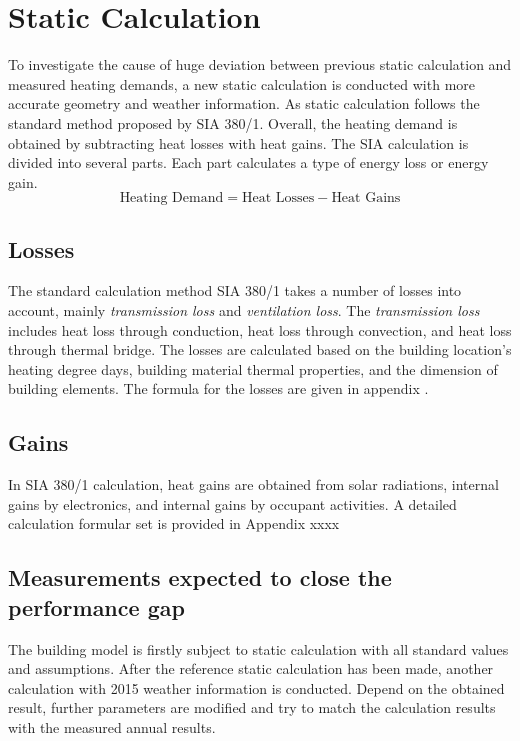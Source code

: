 \documentclass[a4paper, oneside]{discothesis}
\begin{document}
	\section{Static Calculation}
		To investigate the cause of huge deviation between previous static calculation and measured heating demands, a new static calculation is conducted with more accurate geometry and weather information. As static calculation follows the standard method proposed by SIA 380/1. Overall, the heating demand is obtained by subtracting heat losses with heat gains. The SIA calculation is divided into several parts. Each part calculates a type of energy loss or energy gain. \\
		\[\text{Heating Demand} = \text{Heat Losses} - \text{Heat Gains}\]
		
		\subsection{Losses}
			The standard calculation method SIA 380/1 takes a number of losses into account, mainly \textit{transmission loss} and \textit{ventilation loss}. The \textit{transmission loss} includes heat loss through conduction, heat loss through convection, and heat loss through thermal bridge. The losses are calculated based on the building location's heating degree days, building material thermal properties, and the dimension of building elements. The formula for the losses are given in appendix .\\

		\subsection{Gains}
			In SIA 380/1 calculation, heat gains are obtained from solar radiations, internal gains by electronics, and internal gains by occupant activities. A detailed calculation formular set is provided in Appendix xxxx \\
			
		\subsection{Measurements expected to close the performance gap}
			The building model is firstly subject to static calculation with all standard values and assumptions. After the reference static calculation has been made, another calculation with 2015 weather information is conducted. Depend on the obtained result, further parameters are modified and try to match the calculation results with the measured annual results.
\end{document}
